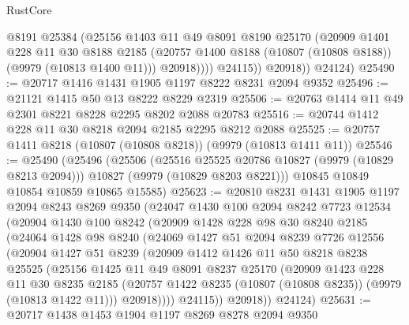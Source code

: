 \begin{lexlean}{RustCore}
\begin{coremodule}
                  @8191
                  @25384
                  (@25156
                    @1403
                    @11
                    @49
                    @8091
                    @8190
                    @25170
                    (@20909
                      @1401
                      @228
                      @11
                      @30
                      @8188
                      @2185
                      (@20757 @1400 @8188 (@10807 (@10808 @8188)) (@9979 (@10813 @1400 @11)))
                      @20918))))
              @24115))
          @20918))
      @24124)
@25490 := @20717 @1416 @1431 @1905 @1197 @8222 @8231 @2094 @9352
@25496 := @21121 @1415 @50 @13 @8222 @8229 @2319
@25506 := @20763 @1414 @11 @49 @2301 @8221 @8228 @2295 @8202 @2088 @20783
@25516 := @20744 @1412 @228 @11 @30 @8218 @2094 @2185 @2295 @8212 @2088
@25525 := @20757 @1411 @8218 (@10807 (@10808 @8218)) (@9979 (@10813 @1411 @11))
@25546 := @25490
    (@25496
      (@25506
        (@25516 @25525 @20786 @10827 (@9979 (@10829 @8213 @2094)))
        @10827
        (@9979 (@10829 @8203 @8221)))
      @10845
      @10849
      @10854
      @10859
      @10865
      @15585)
@25623 := @20810
    @8231
    @1431
    @1905
    @1197
    @2094
    @8243
    @8269
    @9350
    (@24047
      @1430
      @100
      @2094
      @8242
      @7723
      @12534
      (@20904
        @1430
        @100
        @8242
        (@20909
          @1428
          @228
          @98
          @30
          @8240
          @2185
          (@24064
            @1428
            @98
            @8240
            (@24069
              @1427
              @51
              @2094
              @8239
              @7726
              @12556
              (@20904
                @1427
                @51
                @8239
                (@20909
                  @1412
                  @1426
                  @11
                  @50
                  @8218
                  @8238
                  @25525
                  (@25156
                    @1425
                    @11
                    @49
                    @8091
                    @8237
                    @25170
                    (@20909
                      @1423
                      @228
                      @11
                      @30
                      @8235
                      @2185
                      (@20757 @1422 @8235 (@10807 (@10808 @8235)) (@9979 (@10813 @1422 @11)))
                      @20918))))
              @24115))
          @20918))
      @24124)
@25631 := @20717 @1438 @1453 @1904 @1197 @8269 @8278 @2094 @9350

\end{coremodule}
\end{lexlean}
